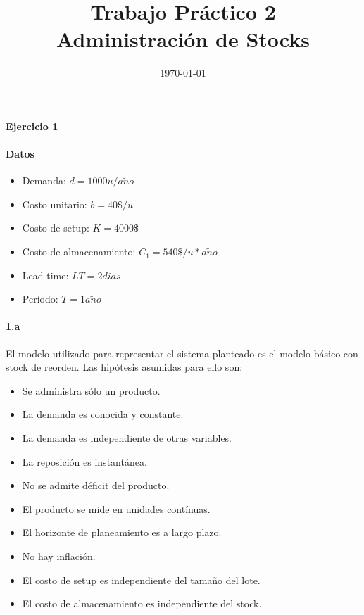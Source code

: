 \documentclass{article}
\title{Trabajo Práctico 2\\Administración de Stocks}
\author{}
\date{\today}
\def \anio {a\tilde{n}o}
\begin{document}
\maketitle

\paragraph{Ejercicio 1}
  \paragraph{Datos}
    \begin{itemize}
      \item Demanda: $d = 1000u/\anio$
      \item Costo unitario: $b = 40\$/u$
      \item Costo de setup: $K = 4000\$$ 
      \item Costo de almacenamiento: $C_1 = 540\$/u * \anio$
      \item Lead time: $LT = 2dias$
      \item Período: $T = 1\anio$
    \end{itemize}

  \paragraph{1.a}
    El modelo utilizado para representar el sistema planteado es el modelo básico con stock de reorden. Las hipótesis asumidas para ello son:
    \begin{itemize}
      \item Se administra sólo un producto.
      \item La demanda es conocida y constante.
      \item La demanda es independiente de otras variables.
      \item La reposición es instantánea.
      \item No se admite déficit del producto.
      \item El producto se mide en unidades contínuas.
      \item El horizonte de planeamiento es a largo plazo.
      \item No hay inflación.
      \item El costo de setup es independiente del tamaño del lote.
      \item El costo de almacenamiento es independiente del stock.
    \end{itemize}
\end{document}
